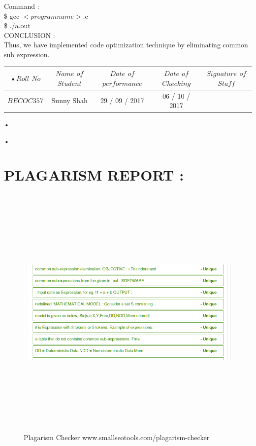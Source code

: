 \documentclass[11pt]{article}
\begin{document}
	\noindent
	Command :\\
	\$ gcc $<program name>$.c\\ \$ ./a.out\\
	
	\noindent
	CONCLUSION :\\	
	Thus, we have implemented code optimization technique by eliminating common sub expression.
	
	\begin{center}
		\begin{tabular}{|c|c|c|c|c|}
			•$Roll$ $No$ & $Name$ $of$ $Student$ & $Date$ $of$ $performance$ & $Date$ $of$ $Checking$ & $Signature$ $of$ $Staff$ \\ \hline
			$BECOC357$ & Sunny Shah&29 / 09 / 2017& 06 / 10 / 2017  & \\ \hline
		\end{tabular}•
	\end{center}•
	\newpage
	\section{PLAGARISM REPORT :}
	\begin{figure}[h!]
		\centering
		\includegraphics[height=5in,width=6in]{plagiarism7.png}
		\caption{Plagarism Checker www.smallseotools.com/plagarism-checker}
	\end{figure}
	\newpage
\end{document}
